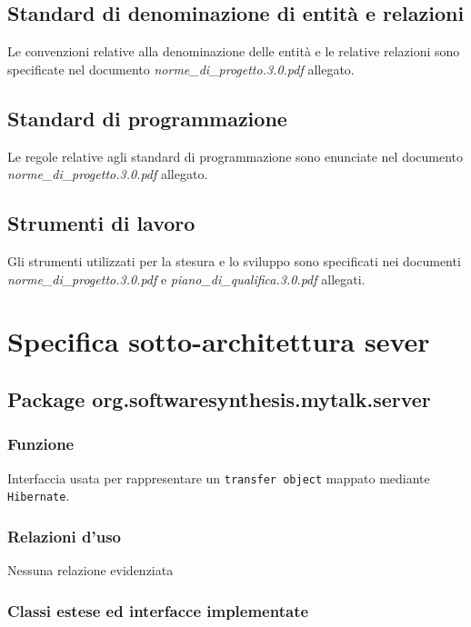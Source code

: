 \subsection{Standard di denominazione di entità e relazioni}
Le convenzioni relative alla denominazione delle entità e le relative relazioni sono specificate nel documento \textit{norme\_di\_progetto.3.0.pdf} allegato.

\subsection{Standard di programmazione}
Le regole relative agli standard di programmazione sono enunciate nel documento \textit{norme\_di\_progetto.3.0.pdf} allegato.

\subsection{Strumenti di lavoro}
Gli strumenti utilizzati per la stesura e lo sviluppo sono specificati nei documenti \textit{norme\_di\_progetto.3.0.pdf} e \textit{piano\_di\_qualifica.3.0.pdf} allegati.

\clearpage

\section{Specifica sotto-architettura sever}\label{sec:serverarchitecture}

\subsection{Package org.softwaresynthesis.mytalk.server}\label{sec:server}


\subsubsection*{Funzione}
Interfaccia usata per rappresentare un \texttt{transfer object} mappato mediante \texttt{Hibernate}.

\subsubsection*{Relazioni d'uso}

Nessuna relazione evidenziata

\subsubsection*{Classi estese ed interfacce implementate}

